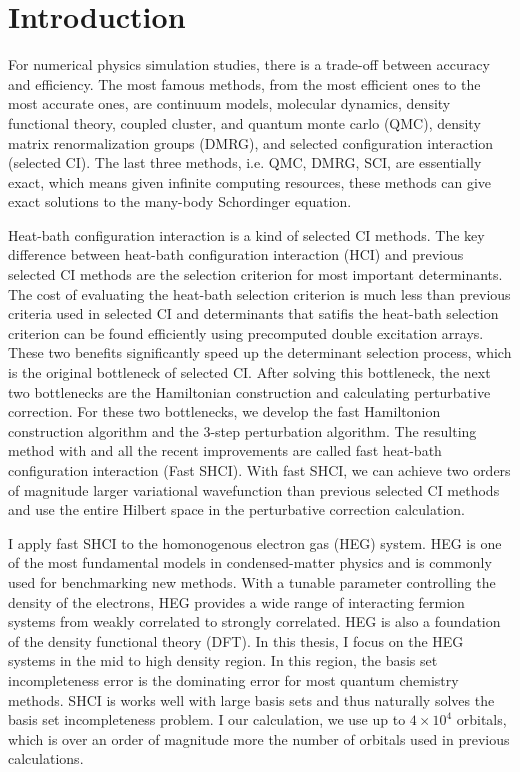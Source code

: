 \documentclass[phd,tocprelim]{cornell}
\begin{document}
\normalspacing \setcounter{page}{1} 
\pagestyle{cornell} \addtolength{\parskip}{0.5\baselineskip}

\chapter{Introduction}

For numerical physics simulation studies, there is a trade-off between accuracy and efficiency.
The most famous methods, from the most efficient ones to the most accurate ones, are continuum models, molecular dynamics, density functional theory, coupled cluster, and quantum monte carlo (QMC), density matrix renormalization groups (DMRG), and selected configuration interaction (selected CI).
The last three methods, i.e. QMC, DMRG, SCI, are essentially exact, which means given infinite computing resources, these methods can give exact solutions to the many-body Schordinger equation.

Heat-bath configuration interaction is a kind of selected CI methods.
The key difference between heat-bath configuration interaction (HCI) and previous selected CI methods are the selection criterion for most important determinants.
The cost of evaluating the heat-bath selection criterion is much less than previous criteria used in selected CI and determinants that satifis the heat-bath selection criterion can be found efficiently using precomputed double excitation arrays.
These two benefits significantly speed up the determinant selection process, which is the original bottleneck of selected CI.
After solving this bottleneck, the next two bottlenecks are the Hamiltonian construction and calculating perturbative correction.
For these two bottlenecks, we develop the fast Hamiltonion construction algorithm and the 3-step perturbation algorithm.
The resulting method with and all the recent improvements are called fast heat-bath configuration interaction (Fast SHCI).
With fast SHCI, we can achieve two orders of magnitude larger variational wavefunction than previous selected CI methods and use the entire Hilbert space in the perturbative correction calculation.

I apply fast SHCI to the homonogenous electron gas (HEG) system.
HEG is one of the most fundamental models in condensed-matter physics and is commonly used for benchmarking new methods.
With a tunable parameter controlling the density of the electrons, HEG provides a wide range of interacting fermion systems from weakly correlated to strongly correlated.
HEG is also a foundation of the density functional theory (DFT).
In this thesis, I focus on the HEG systems in the mid to high density region.
In this region, the basis set incompleteness error is the dominating error for most quantum chemistry methods.
SHCI is works well with large basis sets and thus naturally solves the basis set incompleteness problem.
I our calculation, we use up to $4\times10^4$ orbitals, which is over an order of magnitude more the number of orbitals used in previous calculations.
\end{document}
